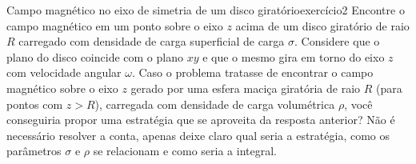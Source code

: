 \begin{exercício}{Campo magnético no eixo de simetria de um disco giratório}{exercício2}
    Encontre o campo magnético em um ponto sobre o eixo \(z\) acima de um disco giratório de raio \(R\) carregado com densidade de carga superficial de carga \(\sigma\). Considere que o plano do disco coincide com o plano \(xy\) e que o mesmo gira em torno do eixo \(z\) com velocidade angular \(\omega\). Caso o problema tratasse de encontrar o campo magnético sobre o eixo \(z\) gerado por uma esfera maciça giratória de raio \(R\) (para pontos com \(z > R\)), carregada com densidade de carga volumétrica \(\rho\), você conseguiria propor uma estratégia que se aproveita da resposta anterior? Não é necessário resolver a conta, apenas deixe claro qual seria a estratégia, como os parâmetros \(\sigma\) e \(\rho\) se relacionam e como seria a integral.
\end{exercício}
